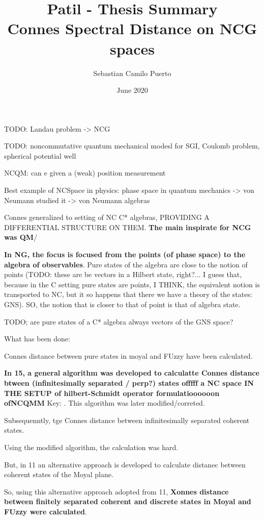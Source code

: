\documentclass{article}
\title{Patil - Thesis Summary\\Connes Spectral Distance on NCG spaces}
\author{Sebastian Camilo Puerto}
\date{June 2020}
\begin{document}
\maketitle

\tableofcontents
TODO: Landau problem -> NCG

TODO: noncommutative quantum mechanical modesl for SGI, Coulomb problem, spherical potential well

NCQM: can e given a (weak) position measurement

Best example of NCSpace in physics: phase space in quantum mechanics -> von Neumann studied it -> von Neumann algebras

Connes generalized to setting of NC C* algebras, PROVIDING A DIFFERENTIAL STRUCTURE ON THEM.
\textbf{The main inspirate for NCG was QM}/

\textbf{In NG, the focus is focused from the points (of phase space) to the algebra of observables}. Pure states of the algebra are close to the notion of points (TODO: these are be vectors in a Hilbert state, right?... I guess that, because in the C setting pure states are points, I THINK, the equivalent notion is transported to NC, but it so happens that there we have a theory of the states: GNS). SO, the notion that is closer to that of point is that of algebra state.

TODO; are pure states of a C* algebra always vectors of the GNS space?

What has been done:

Connes distance between pure states in moyal and FUzzy have been calculated.

\textbf{In 15, a general algorithm was developed to calculatte Connes distance btween (infinitesimally separated / perp?) states offfff a NC space IN THE SETUP of hilbert-Schmidt operator formulatioooooon ofNCQMM} Key: . This algorithm was later modified/correted.

Subsequenntly, tge Connes distance between infinitesimally separated coherent states.

Using the modified algorithm, the calculation was hard.

But, in 11 an alternative approach is developed to calculate distanec between coherent states of the Moyal plane.

So, using this alternative approach adopted from 11, \textbf{Xonnes distance between finitely separated coherent and discrete states in Moyal and FUzzy were calculated}.
\end{document}
